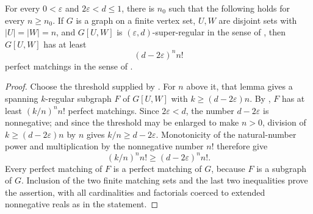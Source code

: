 \begin{lemma}
For every $0<\varepsilon$ and $2\varepsilon<d\leq1$, there is $n_0$ such that the following holds for every $n\geq n_0$.  If $G$ is a graph on a finite vertex set, $U,W$ are disjoint sets with $|U|=|W|=n$, and $G[U,W]$ is $(\varepsilon,d)$-super-regular in the sense of , then $G[U,W]$ has at least
\[
 (d-2\varepsilon)^n n!
\]
perfect matchings in the sense of .
\end{lemma}
\begin{proof}
Choose the threshold supplied by .  For
$n$ above it, that lemma gives a spanning $k$-regular subgraph $F$ of
$G[U,W]$ with $k\geq(d-2\varepsilon)n$.  By
, $F$ has at least
$(k/n)^n n!$ perfect matchings.  Since $2\varepsilon<d$, the number
$d-2\varepsilon$ is nonnegative; and since the threshold may be enlarged to
make $n>0$, division of $k\geq(d-2\varepsilon)n$ by $n$ gives
$k/n\geq d-2\varepsilon$.  Monotonicity of the natural-number power and
multiplication by the nonnegative number $n!$ therefore give
\[
 (k/n)^n n!\geq(d-2\varepsilon)^n n!.
\]
Every perfect matching of $F$ is a perfect matching of $G$, because $F$ is
a subgraph of $G$.  Inclusion of the two finite matching sets and the last
two inequalities prove the assertion, with all cardinalities and factorials
coerced to extended nonnegative reals as in the statement.
\end{proof}
